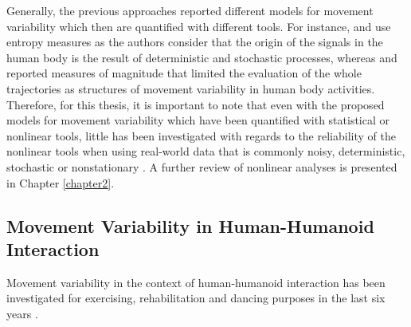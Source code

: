 Generally, the previous approaches reported different models 
for movement variability which then are quantified with different tools.
For instance, \cite{hatze1986} and \cite{preatoni2010, preatoni2013} 
use entropy measures as the authors consider that the origin of the 
signals in the human body is the result of deterministic and 
stochastic processes, whereas 
\cite{muller2004} and \cite{seifert2011} reported 
measures of magnitude that limited the evaluation of the 
whole trajectories as structures of movement variability in 
human body activities.
Therefore, for this thesis, it is important to note that
even with the proposed models for movement variability 
\citep{hatze1986, preatoni2010, preatoni2013, muller2004, seifert2011} 
which have been quantified with statistical or nonlinear tools,
little has been investigated with regards to the reliability of the nonlinear 
tools when using real-world data that is commonly noisy, 
deterministic, stochastic or nonstationary \citep{newell1998}.
A further review of nonlinear analyses is presented in Chapter \ref{chapter2}.





\subsection{Movement Variability in Human-Humanoid Interaction}
Movement variability in the context of human-humanoid interaction has been 
investigated for exercising, rehabilitation and dancing purposes in the 
last six years
\citep{gorer2013, guneysu2014, guneysu2015, tsuchida2013, peng2015}.


